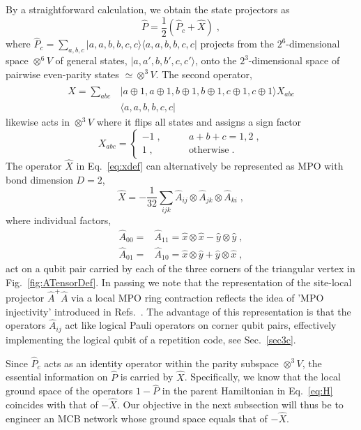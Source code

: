 \documentclass[twocolumn,floats,prx,showpacs]{revtex4-1}
\newcommand{\ket}[1]{|#1\rangle}
\newcommand{\bra}[1]{\langle#1|}
\begin{document}
By a straightforward calculation, we obtain the state projectors as 
\begin{equation}
\hat P =\frac{1}{2} (\hat P_c +\hat X)\;,
\end{equation}
where $\hat P_c=\sum_{a,b,c} \ket{a,a,b,b,c,c} \bra{a,a,b,b,c,c}$
projects from the $2^6$-dimensional space $\otimes^6 V$ of general states, $\ket{a,a',b,b',c,c'}$, onto the $2^3$-dimensional space of 
pairwise even-parity states $\simeq \otimes^3 V$. 
The second operator,
\begin{align}
\hat X=\sum_{abc} &\ket{a\oplus 1,a\oplus 1,b\oplus 1,b\oplus 1,c\oplus 1,c \oplus 1} X_{abc} \nonumber \\ &\bra{a,a,b,b,c,c}
\label{eq:xdef}
\end{align}
likewise acts in $\otimes^3V$ where it flips all states and assigns a sign factor 
\begin{equation}\label{eq:xdef1b}
X_{abc} = \begin{cases} -1\;, \qquad & a+b+c=1,2\;, \\ 1\;, \qquad  &\text{otherwise}\;. 
\end{cases}
\end{equation}
The operator $\hat X$ in Eq.~\eqref{eq:xdef} can alternatively be represented as MPO with bond dimension $D=2$,
\begin{equation}\label{eq:xdef2}
\hat X = - \frac{1}{32} \sum_{ijk} \hat A_{ij} \otimes \hat A_{jk} \otimes \hat A_{ki}\;,
\end{equation}
where individual factors, 
\begin{align}\nonumber
\hat A_{00}=& \hat A_{11} = \hat x \otimes \hat x -\hat y \otimes \hat y\;, \\ \label{eq:logpauli}
\hat A_{01}=& \hat A_{10}=\hat x \otimes \hat y + \hat y \otimes \hat x \; ,
\end{align}
act on a qubit pair carried by each of the three corners
of the triangular vertex in Fig.~\ref{fig:ATensorDef}. In passing we note that the representation of the site-local projector $\hat A^+ \hat A$ via a local MPO ring contraction reflects the idea of 'MPO injectivity' introduced in Refs.~\cite{Buerschaper-AnnPhys-2014,1409.2150}.
The advantage of this representation is that the operators $\hat A_{ij}$ act like logical Pauli operators on corner qubit pairs, effectively implementing the logical qubit of a repetition code, see Sec.~\ref{sec3c}.

Since $\hat P_c$ acts as an identity operator within the parity subspace $\otimes^3 V$, the essential information on $\hat P$ is carried by $\hat X$. Specifically, we know that the local ground space of the operators $1-\hat P$ in the parent Hamiltonian in Eq.~\eqref{eq:H} coincides with that of $-\hat X$. Our objective in the next subsection will thus be to engineer an MCB network whose ground space equals that of $-\hat X$. 
\end{document}
